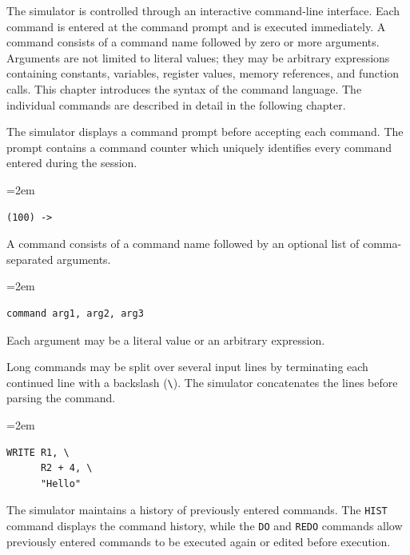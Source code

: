 
The simulator is controlled through an interactive command-line interface. Each command is entered at the command prompt and is executed immediately. A command consists of a command name followed by zero or more arguments. Arguments are not limited to literal values; they may be arbitrary expressions containing constants, variables, register values, memory references, and function calls. This chapter introduces the syntax of the command language. The individual commands are described in detail in the following chapter.


The simulator displays a command prompt before accepting each command. The prompt contains a command counter which uniquely identifies every command entered during the session.

\begin{list}{}{\leftmargin=2em}
\item
\begin{verbatim}
(100) ->
\end{verbatim}
\end{list}

A command consists of a command name followed by an optional list of comma-separated arguments.

\begin{list}{}{\leftmargin=2em}
\item
\begin{verbatim}
command arg1, arg2, arg3
\end{verbatim}
\end{list}

Each argument may be a literal value or an arbitrary expression.

Long commands may be split over several input lines by terminating each continued line with a backslash (\verb|\|). The simulator concatenates the lines before parsing the command.

\begin{list}{}{\leftmargin=2em}
\item
\begin{verbatim}
WRITE R1, \
      R2 + 4, \
      "Hello"
\end{verbatim}
\end{list}

The simulator maintains a history of previously entered commands. The \texttt{HIST} command displays the command history, while the \texttt{DO} and \texttt{REDO} commands allow previously entered commands to be executed again or edited before execution.


